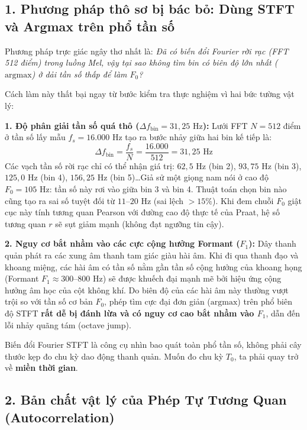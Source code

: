 \documentclass[11pt,a4paper]{article}
\begin{document}
\subsection*{1. Phương pháp thô sơ bị bác bỏ: Dùng STFT và Argmax trên phổ tần số}

Phương pháp trực giác ngây thơ nhất là: \textit{Đã có biến đổi Fourier rời rạc (FFT 512 điểm) trong luồng Mel, vậy tại sao không tìm bin có biên độ lớn nhất ($\text{argmax}$) ở dải tần số thấp để làm $F_0$?}

Cách làm này thất bại ngay từ bước kiểm tra thực nghiệm vì hai bức tường vật lý:

\textbf{1. Độ phân giải tần số quá thô ($\Delta f_{\text{bin}} = 31{,}25\text{ Hz}$):}
Lưới FFT $N = 512$ điểm ở tần số lấy mẫu $f_s = 16.000\text{ Hz}$ tạo ra bước nhảy giữa hai bin kế tiếp là:
\[
\Delta f_{\text{bin}} = \frac{f_s}{N} = \frac{16.000}{512} = 31{,}25\text{ Hz}
\]
Các vạch tần số rời rạc chỉ có thể nhận giá trị: $62{,}5\text{ Hz}$ (bin 2), $93{,}75\text{ Hz}$ (bin 3), $125{,}0\text{ Hz}$ (bin 4), $156{,}25\text{ Hz}$ (bin 5)\dots Giả sử một giọng nam nói ở cao độ $F_0 = 105\text{ Hz}$: tần số này rơi vào giữa bin 3 và bin 4. Thuật toán chọn bin nào cũng tạo ra sai số tuyệt đối từ $11\text{--}20\text{ Hz}$ (sai lệch $> 15\%$). Khi đem chuỗi $F_0$ giật cục này tính tương quan Pearson với đường cao độ thực tế của Praat, hệ số tương quan $r$ sẽ sụt giảm mạnh (không đạt ngưỡng tin cậy).

\textbf{2. Nguy cơ bắt nhầm vào các cực cộng hưởng Formant ($F_1$):}
Dây thanh quản phát ra các xung âm thanh tam giác giàu hài âm. Khi đi qua thanh đạo và khoang miệng, các hài âm có tần số nằm gần tần số cộng hưởng của khoang họng (Formant $F_1 \approx 300\text{--}800\text{ Hz}$) sẽ được khuếch đại mạnh mẽ bởi hiệu ứng cộng hưởng âm học của cột không khí. Do biên độ của các hài âm này thường vượt trội so với tần số cơ bản $F_0$, phép tìm cực đại đơn giản ($\text{argmax}$) trên phổ biên độ STFT \textbf{rất dễ bị đánh lừa và có nguy cơ cao bắt nhầm vào $F_1$}, dẫn đến lỗi nhảy quãng tám (octave jump).

\begin{physicalinsight}
Biến đổi Fourier STFT là công cụ nhìn bao quát toàn phổ tần số, không phải cây thước kẹp đo chu kỳ dao động thanh quản. Muốn đo chu kỳ $T_0$, ta phải quay trở về \textbf{miền thời gian}.
\end{physicalinsight}

\subsection*{2. Bản chất vật lý của Phép Tự Tương Quan (Autocorrelation)}
\end{document}
